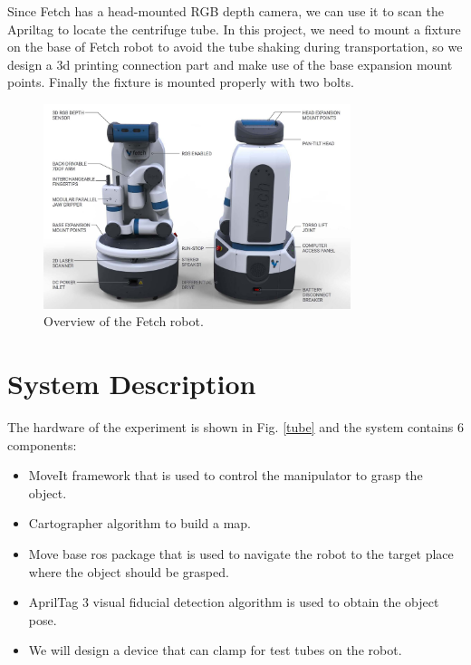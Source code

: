 \documentclass[12pt,draftclsnofoot,onecolumn]{IEEEtran}
\begin{document}
	Since Fetch has a head-mounted RGB depth camera, we can use it to scan the Apriltag to locate the centrifuge tube. In this project, we need to mount a fixture on the base of Fetch robot to avoid the tube shaking during transportation, so we design a 3d printing connection part and make use of the base expansion mount points. Finally the fixture is mounted properly with two bolts.
   
    \begin{figure}[htbp] %
		\centering
		\includegraphics[width=0.8\textwidth]{img/FetchRobot.jpg}
		\caption{
			Overview of the Fetch robot.
		}
		\label{overview}
	\end{figure}
	
	
	\section{System Description}
	The hardware of the experiment is shown in  Fig. \ref{tube} and the system contains 6 components:
	\begin{itemize}
		\item  MoveIt framework that is used to control the manipulator to grasp the object.
		\item Cartographer algorithm to build a map.
		\item Move base ros package that is used to navigate the robot to the target place where the object should be grasped.
		\item AprilTag 3 visual fiducial detection algorithm is used to obtain the object pose.
		\item We will design a device that can clamp for test tubes on the robot.
	\end{itemize}
	
\end{document}
